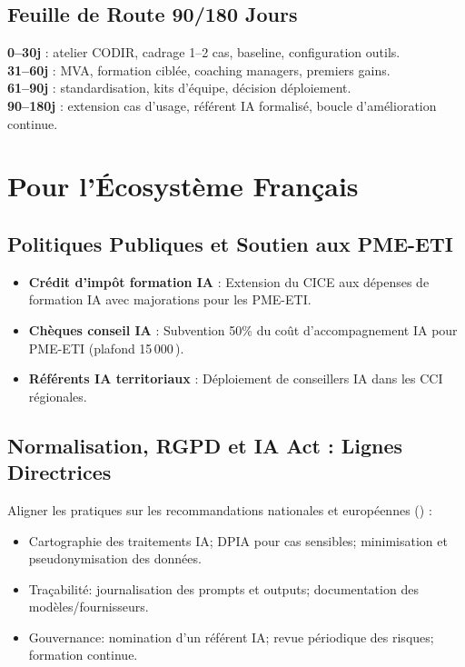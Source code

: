 \subsection{Feuille de Route 90/180 Jours}
\textbf{0–30j} : atelier CODIR, cadrage 1–2 cas, baseline, configuration outils.\\
\textbf{31–60j} : MVA, formation ciblée, coaching managers, premiers gains.\\
\textbf{61–90j} : standardisation, kits d’équipe, décision déploiement.\\
\textbf{90–180j} : extension cas d’usage, référent IA formalisé, boucle d’amélioration continue.

\section{Pour l'Écosystème Français}

\subsection{Politiques Publiques et Soutien aux PME-ETI}

\begin{itemize}
    \item \textbf{Crédit d'impôt formation IA} : Extension du CICE aux dépenses de formation IA avec majorations pour les PME-ETI.
    \item \textbf{Chèques conseil IA} : Subvention 50\% du coût d'accompagnement IA pour PME-ETI (plafond 15\,000\,\texteuro{}).
    \item \textbf{Référents IA territoriaux} : Déploiement de conseillers IA dans les CCI régionales.
\end{itemize}

\subsection{Normalisation, RGPD et IA Act : Lignes Directrices}
Aligner les pratiques sur les recommandations nationales et européennes (\cite{eu2024ai_act, cnil2023ia, dinum2024guide}) :
\begin{itemize}
    \item Cartographie des traitements IA; DPIA pour cas sensibles; minimisation et pseudonymisation des données.
    \item Traçabilité: journalisation des prompts et outputs; documentation des modèles/fournisseurs.
    \item Gouvernance: nomination d’un référent IA; revue périodique des risques; formation continue.
\end{itemize}

